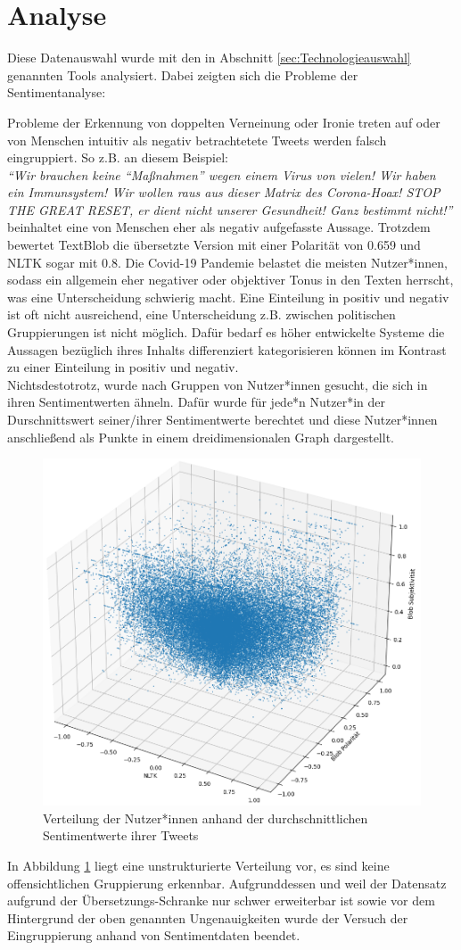 \section{Analyse}
\label{sentiment-daten-analyse}
Diese Datenauswahl wurde mit den in Abschnitt \ref{sec:Technologieauswahl} genannten Tools analysiert. Dabei zeigten sich die Probleme der Sentimentanalyse:

Probleme der Erkennung von doppelten Verneinung oder Ironie treten auf oder von Menschen intuitiv als negativ betrachtetete Tweets werden falsch eingruppiert.
So z.B. an diesem Beispiel:\\
\textit{"`Wir brauchen keine "`Maßnahmen"' wegen einem Virus von vielen! Wir haben ein Immunsystem! Wir wollen raus aus dieser Matrix des Corona-Hoax! STOP THE GREAT RESET, er dient nicht unserer Gesundheit! Ganz bestimmt nicht!"'} \\beinhaltet eine von Menschen eher als negativ aufgefasste Aussage. Trotzdem bewertet TextBlob die übersetzte Version mit einer Polarität von 0.659 und NLTK sogar mit 0.8. 
Die Covid-19 Pandemie belastet die meisten Nutzer*innen, sodass ein allgemein eher negativer oder objektiver Tonus in den Texten herrscht, was eine Unterscheidung schwierig macht. 
Eine Einteilung in positiv und negativ ist oft nicht ausreichend, eine Unterscheidung z.B. zwischen politischen Gruppierungen ist nicht möglich.
Dafür bedarf es höher entwickelte Systeme die Aussagen bezüglich ihres Inhalts differenziert kategorisieren können im Kontrast zu einer Einteilung in positiv und negativ.\\
Nichtsdestotrotz, wurde nach Gruppen von Nutzer*innen gesucht, die sich in ihren Sentimentwerten ähneln. 
Dafür wurde für jede*n Nutzer*in der Durschnittswert seiner/ihrer Sentimentwerte berechtet und diese Nutzer*innen anschließend als Punkte in einem dreidimensionalen Graph dargestellt.
\begin{figure}[h!]
	\centering
	\includegraphics[width=0.5\linewidth]{images/SentimentPlot}
	\caption[]{Verteilung der Nutzer*innen anhand der durchschnittlichen Sentimentwerte ihrer Tweets}
	\label{fig:sentimentplot}
\end{figure}

In Abbildung \ref{fig:sentimentplot}  liegt eine unstrukturierte Verteilung vor, es sind keine offensichtlichen Gruppierung erkennbar.
Aufgrunddessen und weil der Datensatz aufgrund der Übersetzungs-Schranke nur schwer erweiterbar ist sowie vor dem Hintergrund der oben genannten Ungenauigkeiten wurde der Versuch der Eingruppierung anhand von Sentimentdaten beendet.
